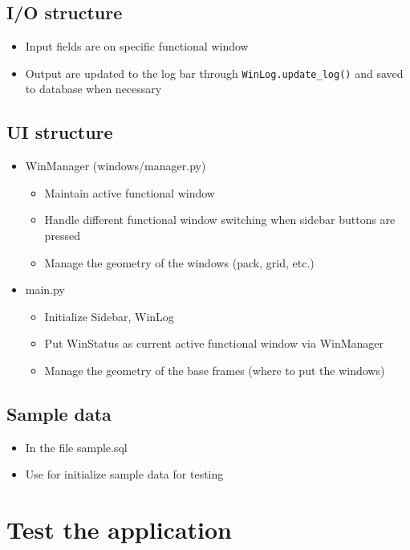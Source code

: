 \documentclass[12pt,oneside,a4paper]{article}
\begin{document}
\subsection{I/O structure}
\begin{itemize}
  \item Input fields are on specific functional window
  \item Output are updated to the log bar through \texttt{WinLog.update\_log()} and saved to database when necessary
\end{itemize}

\subsection{UI structure}
\begin{itemize}
  \item WinManager (windows/manager.py)
    \begin{itemize}
      \item Maintain active functional window
      \item Handle different functional window switching when sidebar buttons are pressed
      \item Manage the geometry of the windows (pack, grid, etc.)
    \end{itemize}
  \item main.py
    \begin{itemize}
      \item Initialize Sidebar, WinLog
      \item Put WinStatus as current active functional window via WinManager
      \item Manage the geometry of the base frames (where to put the windows)
    \end{itemize}
\end{itemize}

\subsection{Sample data}
\begin{itemize}
  \item In the file sample.sql
  \item Use for initialize sample data for testing
\end{itemize}

\newpage

\section{Test the application}
\end{document}
